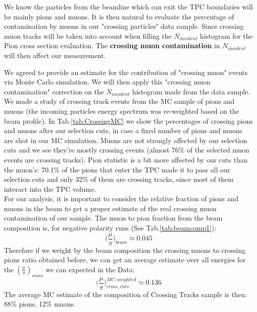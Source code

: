 We know the particles from the beamline which can exit the TPC boundaries will be mainly pions and muons. It is then natural to evaluate the percentage of contamination by muons in our "crossing particles" data sample. Since crossing muon tracks will be taken into account when filling the $N_{incident}$ histogram for the Pion cross section evaluation. The {\textbf{crossing muon contamination}} in $N_{incident}$ will then affect our measurement.

We agreed to provide an estimate for the contribution of "crossing muon" events via Monte Carlo simulation. We will then apply this "crossing muon contamination" correction on the $N_{incident}$ histogram made from the data sample.\\
We made a study of crossing track events from the MC sample of pions and muons (the incoming particles energy spectrum was re-weighted based on the beam profile). In Tab.\ref{tab:CrossingMC} we show the percentages of crossing pions and muons after our selection cuts, in case a fixed number of pions and muons are shot in our MC simulation. Muons are not strongly affected by our selection cuts and we see they're mostly crossing events (almost 76\% of the selected muon events are crossing tracks). Pion statistic is a bit more affected by our cuts than the muon's: 70.1\% of the pions that enter the TPC made it to pass all our selection cuts and only 32\% of them are crossing tracks, since most of them interact into the TPC volume.\\
For our analysis, it is important to consider the relative fraction of pions and muons in the beam to get a proper estimate of the real crossing muon contamination of our sample. The muon to pion fraction from the beam composition is, for negative polarity runs (See Tab.\ref{tab:beamcomp1}): 
$$ \Big(\frac{\mu}{\pi}\Big)_{beam} \simeq 0.045 $$
Therefore if we weight by the beam composition the crossing muons to crossing pions ratio obtained before, we can get an average estimate over all energies for the $(\frac{\mu}{\pi})_{cross}$ we can expected in the Data:
$$ \Big(\frac{\mu}{\pi}\Big)_{cross,cuts}^{MC, weighted} \simeq  0.136 $$
The average MC estimate of the composition of Crossing Tracks sample is then: 88\% pions, 12\% muons.\\ 

